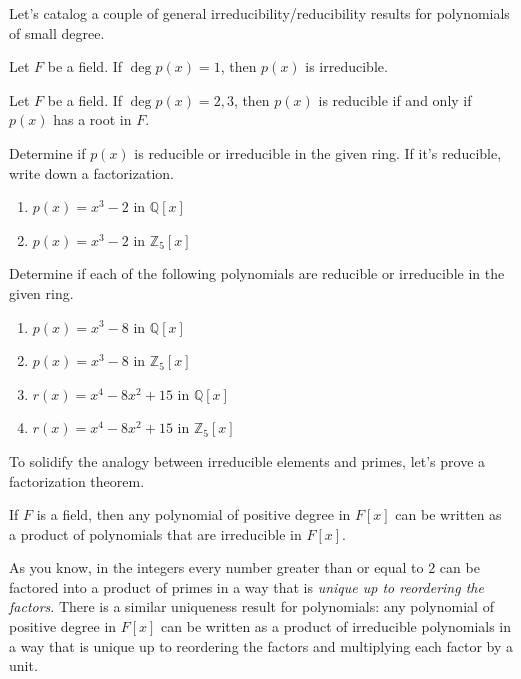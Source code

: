 Let's catalog a couple of general irreducibility/reducibility results for polynomials of small degree.

\begin{theorem}
Let $F$ be a field. If $\deg p(x) = 1$, then $p(x)$ is irreducible.
\end{theorem}

\begin{theorem}\label{thm.ReducibilityTestDegree2or3}
Let $F$ be a field. If $\deg p(x) = 2,3$, then $p(x)$ is reducible if and only if $p(x)$ has a root in $F$.
\end{theorem}

\begin{problem}
Determine if $p(x)$ is reducible or irreducible in the given ring. If it's reducible, write down a factorization.
\begin{multicols}{2}
\begin{enumerate}
\item $p(x) = x^3-2$ in $\mathbb{Q}[x]$
\item $p(x) = x^3-2$ in $\mathbb{Z}_5[x]$
\end{enumerate}
\end{multicols}
\end{problem}

\begin{problem}
Determine if each of the following polynomials are reducible or irreducible in the given ring.
\begin{multicols}{2}
\begin{enumerate}
\item $p(x) = x^3-8$ in $\mathbb{Q}[x]$
\item $p(x) = x^3-8$ in $\mathbb{Z}_5[x]$
\item $r(x) = x^4-8x^2+15$ in $\mathbb{Q}[x]$
\item $r(x) = x^4-8x^2+15$ in $\mathbb{Z}_5[x]$
\end{enumerate}
\end{multicols}
\end{problem}

To solidify the analogy between irreducible elements and primes, let's prove a factorization theorem.

\begin{theorem}\label{thm.FactorIrreducibles}
If $F$ is a field, then any polynomial of positive degree in $F[x]$ can be written as a product of polynomials that are irreducible in $F[x]$.
\end{theorem}

As you know, in the integers every number greater than or equal to $2$ can be factored into a product of primes in a way that is \emph{unique up to reordering the factors}. There is a similar uniqueness result for polynomials: any polynomial of positive degree in $F[x]$ can be written as a product of irreducible polynomials in a way that is unique up to reordering the factors and multiplying each factor by a unit.

